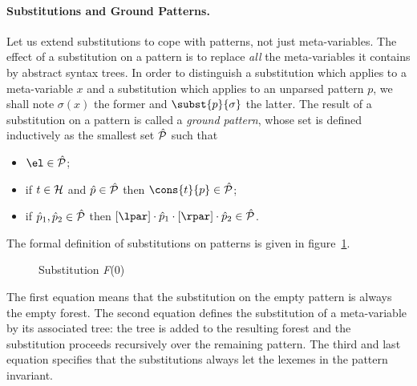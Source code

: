 \paragraph{Substitutions and Ground Patterns.} 

Let us extend substitutions to cope with patterns, not just
meta\hyp{}variables. The effect of a substitution on a pattern is to
replace \emph{all} the meta\hyp{}variables it contains by abstract
syntax trees. In order to distinguish a substitution which applies to
a meta\hyp{}variable \(x\) and a substitution which applies to an
unparsed pattern \(p\), we shall note \(\sigma(x)\) the
former and \(\subst{p}{\sigma}\) the latter. The result of
a substitution on a pattern is called a \emph{ground pattern}, whose
set is defined inductively as the smallest set \(\hat{\cal P}\) such
that
\begin{itemize}

  \item \(\el \in \hat{\cal P}\);

  \item if \(t \in {\cal H}\) and \(\hat{p} \in \hat{\cal P}\) then
    \(\cons{t}{p} \in \hat{\cal P}\);

  \item if \(\hat{p}_1, \hat{p}_2 \in \hat{\cal P}\) then
    \([\lpar] \cdot \hat{p}_1 \cdot [\rpar] \cdot \hat{p}_2 \in
    \hat{\cal P}\).

\end{itemize}
The formal definition of substitutions on patterns is given in
figure~\ref{f0_subst_def}.
\begin{figure}
\caption{Substitution \textit{F}(0)\label{f0_subst_def}}
\end{figure}
The first equation means that the substitution on the empty pattern is
always the empty forest. The second equation defines the substitution
of a meta\hyp{}variable by its associated tree: the tree is added to
the resulting forest and the substitution proceeds recursively over
the remaining pattern. The third and last equation specifies that the
substitutions always let the lexemes in the pattern invariant.

